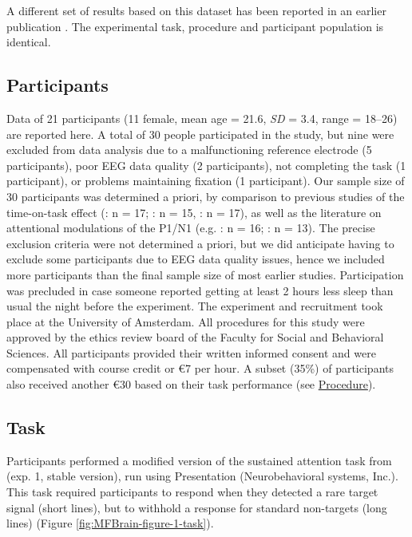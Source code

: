 \documentclass[11pt,english,]{memoir}
\begin{document}
A different set of results based on this dataset has been reported in an earlier publication \autocite{Slagter2016}. The experimental task, procedure and participant population is identical.

\hypertarget{participants-1}{%
\subsection{Participants}\label{participants-1}}

Data of 21 participants (11 female, mean age = 21.6, \emph{SD} = 3.4, range = 18--26) are reported here. A total of 30 people participated in the study, but nine were excluded from data analysis due to a malfunctioning reference electrode (5 participants), poor EEG data quality (2 participants), not completing the task (1 participant), or problems maintaining fixation (1 participant). Our sample size of 30 participants was determined a priori, by comparison to previous studies of the time-on-task effect (\textcite{MacLean2009}: n = 17; \textcite{Lorist2009}: n = 15, \textcite{Boksem2005}: n = 17), as well as the literature on attentional modulations of the P1/N1 (e.g. \textcite{Talsma2007}: n = 16; \textcite{Grent2007}: n = 13). The precise exclusion criteria were not determined a priori, but we did anticipate having to exclude some participants due to EEG data quality issues, hence we included more participants than the final sample size of most earlier studies. Participation was precluded in case someone reported getting at least 2 hours less sleep than usual the night before the experiment. The experiment and recruitment took place at the University of Amsterdam. All procedures for this study were approved by the ethics review board of the Faculty for Social and Behavioral Sciences. All participants provided their written informed consent and were compensated with course credit or €7 per hour. A subset (35\%) of participants also received another €30 based on their task performance (see \protect\hyperlink{procedure-1}{Procedure}).

\hypertarget{task}{%
\subsection{Task}\label{task}}

Participants performed a modified version of the sustained attention task from \textcite{MacLean2009} (exp. 1, stable version), run using Presentation (Neurobehavioral systems, Inc.). This task required participants to respond when they detected a rare target signal (short lines), but to withhold a response for standard non-targets (long lines) (Figure \ref{fig:MFBrain-figure-1-task}).
\end{document}
